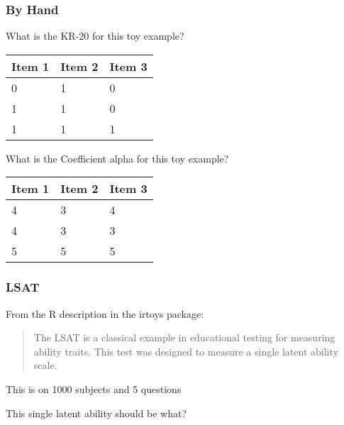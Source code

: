 \documentclass[dvipsnames]{beamer}\usepackage[]{graphicx}\usepackage[]{color}
\begin{document}
\begin{frame}
\frametitle{By Hand}
\begin{multicols}{2}
\footnotesize{
What is the KR-20 for this toy example?
\begin{tabular}{lll}
\hline
Item 1 & Item 2 & Item 3 \\ 
\hline
0 & 1  & 0 \\
1 & 1 & 0   \\
1 & 1 & 1 \\
\hline
\end{tabular}
}
\columnbreak

What is the Coefficient alpha for this toy example?

\footnotesize{
\begin{tabular}{lll}
\hline
Item 1 & Item 2  & Item 3 \\ 
\hline
4 & 3 & 4 \\
4 & 3 & 3\\
5 & 5 & 5 \\
\hline
\end{tabular}
}
\end{multicols}
\end{frame}


\begin{frame}
\frametitle{LSAT}
From the R description in the irtoys package:

\vspace{1cm}
\begin{quote}
The LSAT is a classical example in educational testing for measuring ability traits. This test was designed to measure a single latent ability scale.
\end{quote}

\vspace{1cm}
This is on 1000 subjects and 5 questions

\vspace{1cm}
\textcolor{wared}{This single latent ability should be what?}

\end{frame}
\end{document}
